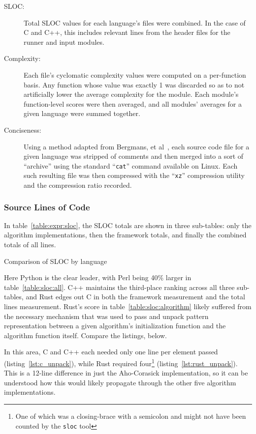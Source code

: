 \begin{description}
\item[SLOC:] Total SLOC values for each language's files were combined. In the case of C and C++, this includes relevant lines from the header files for the runner and input modules.
\item[Complexity:] Each file's cyclomatic complexity values were computed on a per-function basis. Any function whose value was exactly 1 was discarded so as to not artificially lower the average complexity for the module. Each module's function-level scores were then averaged, and all modules' averages for a given language were summed together.
\item[Conciseness:] Using a method adapted from Bergmans, et al~\cite{bergmans}, each source code file for a given language was stripped of comments and then merged into a sort of ``archive'' using the standard ``\texttt{cat}'' command available on Linux. Each such resulting file was then compressed with the ``\texttt{xz}'' compression utility and the compression ratio recorded.
\end{description}

\subsubsection{Source Lines of Code}

In table~\ref{table:expr:sloc}, the SLOC totals are shown in three sub-tables: only the algorithm implementations, then the framework totals, and finally the combined totals of all lines.

\begin{table}[!htb]

\caption{Comparison of SLOC by language}
\label{table:expr:sloc}
\end{table}

Here Python is the clear leader, with Perl being 40\% larger in table~\ref{table:sloc:all}. C++ maintains the third-place ranking across all three sub-tables, and Rust edges out C in both the framework measurement and the total lines measurement. Rust's score in table~\ref{table:sloc:algorithm} likely suffered from the necessary mechanism that was used to pass and unpack pattern representation between a given algorithm's initialization function and the algorithm function itself. Compare the listings, below.





In this area, C and C++ each needed only one line per element passed (listing~\ref{lst:c_unpack}), while Rust required four\footnote{One of which was a closing-brace with a semicolon and might not have been counted by the \texttt{sloc} tool} (listing~\ref{lst:rust_unpack}). This is a 12-line difference in just the Aho-Corasick implementation, so it can be understood how this would likely propagate through the other five algorithm implementations.

